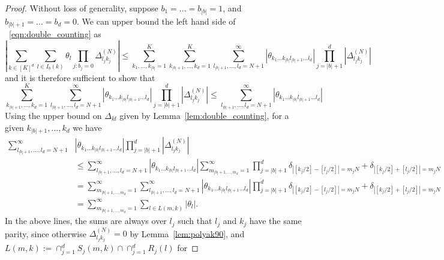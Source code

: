 \documentclass{article}
\newcommand{\abs}[1]{\left \lvert #1 \right \rvert}
\newcommand{\1}{\mathbf{1}}
\theoremstyle{alden}
\theoremstyle{aldenthm}
\theoremstyle{definition}
\theoremstyle{remark}
\begin{document}
\begin{proof}
	Without loss of generality, suppose $b_1 = \ldots = b_{\abs{b}} = 1$, and $b_{\abs{b} + 1} = \ldots = b_{d} = 0$. We can upper bound the left hand side of ~\eqref{eqn:double_counting} as 
	\begin{equation*}
	\abs{\sum_{k \in [K]^d} \sum_{l \in I_b(k)} \theta_l \prod_{j:b_j = 0} \Delta_{l_jk_j}^{(N)}} \leq \sum_{k_1,\ldots,k_{\abs{b}} = 1}^{K} \sum_{k_{\abs{b} + 1},\ldots,k_{d} = 1}^{K} \sum_{l_{\abs{b} + 1}, \ldots, l_d = N + 1}^{\infty} \abs{\theta_{k_1\ldots k_{\abs{b}} l_{\abs{b} + 1} \ldots l_d}} \prod_{j = \abs{b} + 1}^{d} \abs{\Delta_{l_jk_j}^{(N)}}
	\end{equation*}
	and it is therefore sufficient to show that
	\begin{equation}
	\label{eqn:double_counting_pf1}
	\sum_{k_{\abs{b} + 1},\ldots,k_{d} = 1}^{K} \sum_{l_{\abs{b} + 1}, \ldots, l_d = N + 1}^{\infty} \abs{\theta_{k_1\ldots k_{\abs{b}} l_{\abs{b} + 1} \ldots l_d}} \prod_{j = \abs{b} + 1}^{d} \abs{\Delta_{l_jk_j}^{(N)}} \leq \sum_{l_{\abs{b} + 1},\ldots,l_{d} = N + 1}^{\infty} \abs{\theta_{k_1\ldots k_{\abs{b}} l_{\abs{b} + 1} \ldots l_d}}
	\end{equation}
	Using the upper bound on $\Delta_{kl}$ given by Lemma~\ref{lem:double_counting}, for a given $k_{\abs{b} + 1},\ldots,k_d$ we have
	\begin{align}
	\sum_{l_{\abs{b} + 1}, \ldots, l_d = N + 1}^{\infty} & \abs{\theta_{k_1\ldots k_{\abs{b}} l_{\abs{b} + 1} \ldots l_d}} \prod_{j = \abs{b} + 1}^{d} \abs{\Delta_{l_jk_j}^{(N)}} \nonumber \\
	& \leq \sum_{l_{\abs{b} + 1}, \ldots, l_d = N + 1}^{\infty} \abs{\theta_{k_1\ldots k_{\abs{b}} l_{\abs{b} + 1} \ldots l_d}} \sum_{m_{\abs{b} + 1,\ldots, m_d} = 1}^{\infty} \prod_{j = \abs{b} + 1}^{d} \delta_{\abs{[k_j/2] - [l_j/2]} = m_jN} + \delta_{\abs{[k_j/2] + [l_j/2]} = m_jN} \nonumber \\
	& = \sum_{m_{\abs{b} + 1,\ldots, m_d} = 1}^{\infty} \sum_{l_{\abs{b} + 1}, \ldots, l_d = N + 1}^{\infty} \abs{\theta_{k_1\ldots k_{\abs{b}} l_{\abs{b} + 1} \ldots l_d}} \prod_{j = \abs{b} + 1}^{d} \delta_{\abs{[k_j/2] - [l_j/2]} = m_jN} + \delta_{\abs{[k_j/2] + [l_j/2]} = m_jN} \nonumber \\
	& = \sum_{m_{\abs{b} + 1,\ldots, m_d} = 1}^{\infty} \sum_{l \in L(m,k)} \abs{\theta_l}. \label{eqn:double_counting_pf2}
	\end{align}
	In the above lines, the sums are always over $l_j$ such that $l_j$ and $k_j$ have the same parity, since otherwise $\Delta_{l_j k_j}^{(N)} = 0$ by Lemma~\ref{lem:polyak90}, and $L(m,k) := \cap_{j = 1}^{d} S_j(m,k) \cap \cap_{j = 1}^{d} R_j(l)$ for

\end{proof}
\end{document}
